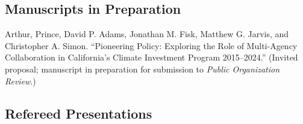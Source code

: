 \documentclass[12pt,letterpaper]{article}
\renewenvironment{itemize}{
  \begin{list}{}{
    \setlength{\leftmargin}{1.5em}
    \setlength{\itemsep}{0.25em}
    \setlength{\parskip}{0pt}
    \setlength{\parsep}{0.25em}
  }
}{
  \end{list}
}
\begin{document}
\subsection*{Manuscripts in Preparation}
  \begin{itemize} \leftmargin=2pt\itemindent=-15pt
    \item Arthur, Prince, David P. Adams, Jonathan M. Fisk, Matthew G. Jarvis, and Christopher A. Simon. ``Pioneering Policy: Exploring the Role of Multi-Agency Collaboration in California's Climate Investment Program 2015--2024.'' (Invited proposal; manuscript in preparation for submission to \textit{Public Organization Review}.)
  \end{itemize}


\subsection*{Refereed Presentations}
\end{document}
